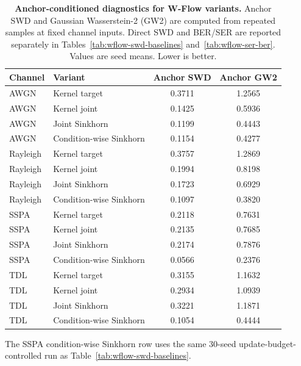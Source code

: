 \begin{table}[!t]
\centering
\caption{\textbf{Anchor-conditioned diagnostics for W-Flow variants.} Anchor SWD and Gaussian Wasserstein-2 (GW2) are computed from repeated samples at fixed channel inputs. Direct SWD and BER/SER are reported separately in Tables~\ref{tab:wflow-swd-baselines} and~\ref{tab:wflow-ser-ber}. Values are seed means. Lower is better.}
\label{tab:wflow-conditional-metrics}
\tablefontsize
\begin{tabular}{@{}llcc@{}}
\toprule
Channel & Variant & Anchor SWD & Anchor GW2 \\
\midrule
AWGN & Kernel target & 0.3711 & 1.2565 \\
AWGN & Kernel joint & 0.1425 & 0.5936 \\
AWGN & Joint Sinkhorn & 0.1199 & 0.4443 \\
AWGN & Condition-wise Sinkhorn & 0.1154 & 0.4277 \\
\midrule
Rayleigh & Kernel target & 0.3757 & 1.2869 \\
Rayleigh & Kernel joint & 0.1994 & 0.8198 \\
Rayleigh & Joint Sinkhorn & 0.1723 & 0.6929 \\
Rayleigh & Condition-wise Sinkhorn & 0.1097 & 0.3820 \\
\midrule
SSPA & Kernel target & 0.2118 & 0.7631 \\
SSPA & Kernel joint & 0.2135 & 0.7685 \\
SSPA & Joint Sinkhorn & 0.2174 & 0.7876 \\
SSPA & Condition-wise Sinkhorn & 0.0566 & 0.2376 \\
\midrule
TDL & Kernel target & 0.3155 & 1.1632 \\
TDL & Kernel joint & 0.2934 & 1.0939 \\
TDL & Joint Sinkhorn & 0.3221 & 1.1871 \\
TDL & Condition-wise Sinkhorn & 0.1054 & 0.4444 \\
\bottomrule
\end{tabular}
\par\vspace{0.25em}
\begin{minipage}{0.92\columnwidth}
\footnotesize\raggedright
The SSPA condition-wise Sinkhorn row uses the same \(30\)-seed update-budget-controlled run as Table~\ref{tab:wflow-swd-baselines}.
\end{minipage}
\end{table}
